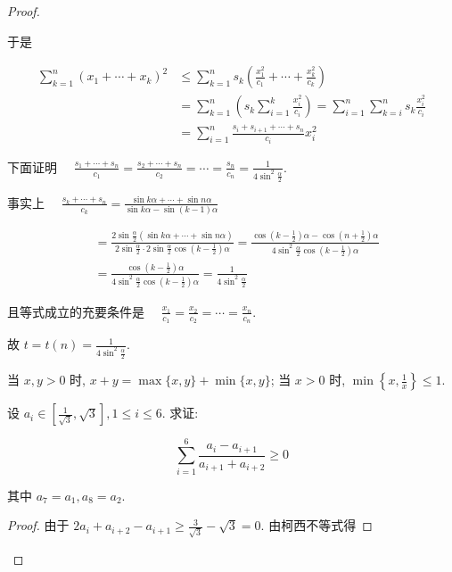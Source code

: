 \begin{proof}
\begin{example}
\begin{solution}
\begin{note}
\begin{solution}
\begin{solution}
	于是
	
	$$
	\begin{aligned}
	\sum_{k=1}^{n}\left(x_{1}+\cdots+x_{k}\right)^{2} & \leqslant \sum_{k=1}^{n} s_{k}\left(\frac{x_{1}^{2}}{c_{1}}+\cdots+\frac{x_{k}^{2}}{c_{k}}\right) \\
	& =\sum_{k=1}^{n}\left(s_{k} \sum_{i=1}^{k} \frac{x_{i}^{2}}{c_{i}}\right)=\sum_{i=1}^{n} \sum_{k=i}^{n} s_{k} \frac{x_{i}^{2}}{c_{i}} \\
	& =\sum_{i=1}^{n} \frac{s_{i}+s_{i+1}+\cdots+s_{n}}{c_{i}} x_{i}^{2}
	\end{aligned}
	$$
	
	下面证明 $\quad \frac{s_{1}+\cdots+s_{n}}{c_{1}}=\frac{s_{2}+\cdots+s_{n}}{c_{2}}=\cdots=\frac{s_{n}}{c_{n}}=\frac{1}{4 \sin ^{2} \frac{\alpha}{2}}$.
	
	事实上 $\quad \frac{s_{k}+\cdots+s_{n}}{c_{k}}=\frac{\sin k \alpha+\cdots+\sin n \alpha}{\sin k \alpha-\sin (k-1) \alpha}$
	
	$$
	\begin{aligned}
	& =\frac{2 \sin \frac{\alpha}{2}(\sin k \alpha+\cdots+\sin n \alpha)}{2 \sin \frac{\alpha}{2} \cdot 2 \sin \frac{\alpha}{2} \cos \left(k-\frac{1}{2}\right) \alpha}=\frac{\cos \left(k-\frac{1}{2}\right) \alpha-\cos \left(n+\frac{1}{2}\right) \alpha}{4 \sin ^{2} \frac{\alpha}{2} \cos \left(k-\frac{1}{2}\right) \alpha} \\
	& =\frac{\cos \left(k-\frac{1}{2}\right) \alpha}{4 \sin ^{2} \frac{\alpha}{2} \cos \left(k-\frac{1}{2}\right) \alpha}=\frac{1}{4 \sin ^{2} \frac{\alpha}{2}}
	\end{aligned}
	$$
	
	且等式成立的充要条件是 $\quad \frac{x_{1}}{c_{1}}=\frac{x_{2}}{c_{2}}=\cdots=\frac{x_{n}}{c_{n}}$.
	
	故 $t=t(n)=\frac{1}{4 \sin ^{2} \frac{\alpha}{2}}$.
\end{solution}
\begin{note}
	当 $x, y>0$ 时, $x+y=\max \{x, y\}+\min \{x, y\}$; 当 $x>0$ 时, $\min \left\{x, \frac{1}{x}\right\} \leqslant 1$.
\end{note}

\begin{example}
	设 $a_{i} \in\left[\frac{1}{\sqrt{3}}, \sqrt{3}\right], 1 \leqslant i \leqslant 6$. 求证:
	
	$$
	\sum_{i=1}^{6} \frac{a_{i}-a_{i+1}}{a_{i+1}+a_{i+2}} \geqslant 0
	$$
	
	其中 $a_{7}=a_{1}, a_{8}=a_{2}$.
\end{example}
\begin{proof}
	由于 $2 a_{i}+a_{i+2}-a_{i+1} \geqslant \frac{3}{\sqrt{3}}-\sqrt{3}=0$. 由柯西不等式得
	

\end{proof}
\end{solution}
\end{note}
\end{solution}
\end{example}
\end{proof}
